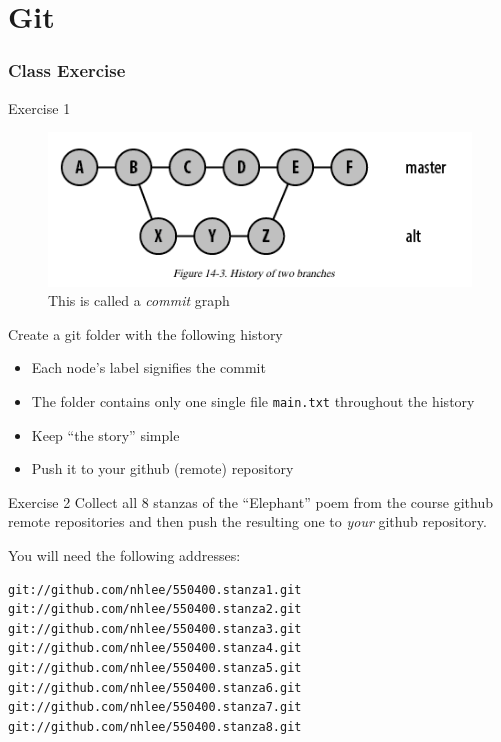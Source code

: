 \documentclass[hyperref={colorlinks=false},handout,10pt]{beamer}
\let\olditem\item
\renewcommand{\item}{\setlength{\itemsep}{0.5\baselineskip}\olditem}
\begin{document}
\section{Git} 
\begin{frame}
    \frametitle{Class Exercise}
    \begin{block}{Exercise 1}
    \begin{figure}
        \caption{\Large This is called a \emph{commit} graph}
        \begin{center}
            \includegraphics[width=\textwidth]{images/gitmergehistory.png}
        \end{center}
    \end{figure}
    \end{block}
    \vskip0.5in
    
    \begin{block}{Create a git folder with the following history}
         \begin{itemize}
             \item Each node's label signifies the commit 
             \item The folder contains only one single file \texttt{main.txt}
                 throughout the history
             \item Keep ``the story'' simple
             \item Push it to your github (remote) repository
         \end{itemize}
    \end{block}

    \begin{block}{Exercise 2}
        Collect all 8 stanzas of the ``Elephant'' poem from the course 
        github remote repositories and then push the resulting 
        one to \emph{your} github repository.
    \end{block}
    You will need the following addresses:
    \begin{lstlisting}
git://github.com/nhlee/550400.stanza1.git 
git://github.com/nhlee/550400.stanza2.git 
git://github.com/nhlee/550400.stanza3.git 
git://github.com/nhlee/550400.stanza4.git 
git://github.com/nhlee/550400.stanza5.git 
git://github.com/nhlee/550400.stanza6.git 
git://github.com/nhlee/550400.stanza7.git 
git://github.com/nhlee/550400.stanza8.git 
    \end{lstlisting}
\end{frame}
\end{document}
